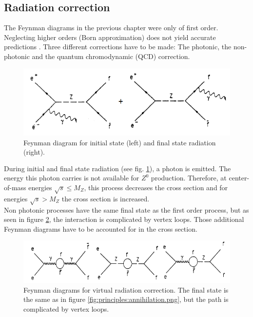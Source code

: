 \subsection{Radiation correction}
\label{sec:principles:radiation correction}
The Feynman diagrams in the previous chapter were only of first order. Neglecting higher orders (Born approximation) does not yield accurate predictions \cite{muenchen}. Three different corrections have to be made: The photonic, the non-photonic and the quantum chromodynamic (QCD) correction.
\begin{figure}[H]
\centering
\includegraphics{graphics/Bremsstrahlungskorrektur}
\caption[Feynman diagram: initial and final state radiation]{Feynman diagram for initial state (left) and final state radiation (right). \cite{muenchen}}
\label{fig:principles:Bremsstrahlungskorrektur}
\end{figure}
During initial and final state radiation (see fig. \ref{fig:principles:Bremsstrahlungskorrektur}), a photon is emitted. The energy this photon carries is not available for $Z^0$ production. Therefore, at center-of-mass energies $\sqrt{s}\leq M_Z$, this process decreases the cross section and for energies $\sqrt{s} > M_Z$ the cross section is increased.\\
Non photonic processes have the same final state as the first order process, but as seen in figure \ref{fig:principles:vertexschleifen}, the interaction is complicated by vertex loops. Those additional Feynman diagrams have to be accounted for in the cross section.\\
\begin{figure}[H]
	\centering
	\includegraphics[width=1.0\linewidth]{graphics/vertexschleifen}
	\caption[Feynman diagrams: virtual radiation]{Feynman diagrams for virtual radiation correction. The final state is the same as in figure \ref{fig:principles:annihilation.png}, but the path is complicated by vertex loops. \cite{muenchen}}
	\label{fig:principles:vertexschleifen}
\end{figure}
